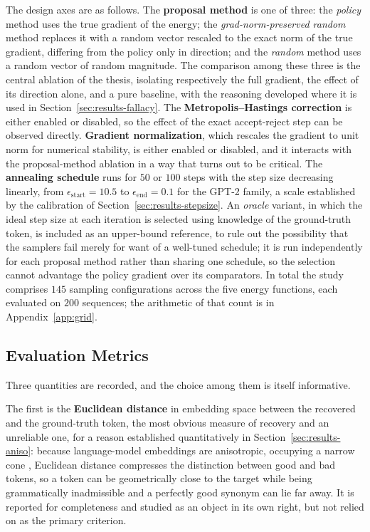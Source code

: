 The design axes are as follows. The \textbf{proposal method} is one of three: the \emph{policy} method uses the true gradient of the energy; the \emph{grad-norm-preserved random} method replaces it with a random vector rescaled to the exact norm of the true gradient, differing from the policy only in direction; and the \emph{random} method uses a random vector of random magnitude. The comparison among these three is the central ablation of the thesis, isolating respectively the full gradient, the effect of its direction alone, and a pure baseline, with the reasoning developed where it is used in Section~\ref{sec:results-fallacy}. The \textbf{Metropolis--Hastings correction} is either enabled or disabled, so the effect of the exact accept-reject step can be observed directly. \textbf{Gradient normalization}, which rescales the gradient to unit norm for numerical stability, is either enabled or disabled, and it interacts with the proposal-method ablation in a way that turns out to be critical. The \textbf{annealing schedule} runs for $50$ or $100$ steps with the step size decreasing linearly, from $\epsilon_{\text{start}} = 10.5$ to $\epsilon_{\text{end}} = 0.1$ for the GPT-2 family, a scale established by the calibration of Section~\ref{sec:results-stepsize}. An \emph{oracle} variant, in which the ideal step size at each iteration is selected using knowledge of the ground-truth token, is included as an upper-bound reference, to rule out the possibility that the samplers fail merely for want of a well-tuned schedule; it is run independently for each proposal method rather than sharing one schedule, so the selection cannot advantage the policy gradient over its comparators. In total the study comprises $145$ sampling configurations across the five energy functions, each evaluated on $200$ sequences; the arithmetic of that count is in Appendix~\ref{app:grid}.

\subsection{Evaluation Metrics}
\label{sec:meth-metrics}

Three quantities are recorded, and the choice among them is itself informative.

The first is the \textbf{Euclidean distance} in embedding space between the recovered and the ground-truth token, the most obvious measure of recovery and an unreliable one, for a reason established quantitatively in Section~\ref{sec:results-aniso}: because language-model embeddings are anisotropic, occupying a narrow cone \citep{ethayarajh2019contextual}, Euclidean distance compresses the distinction between good and bad tokens, so a token can be geometrically close to the target while being grammatically inadmissible and a perfectly good synonym can lie far away. It is reported for completeness and studied as an object in its own right, but not relied on as the primary criterion.

